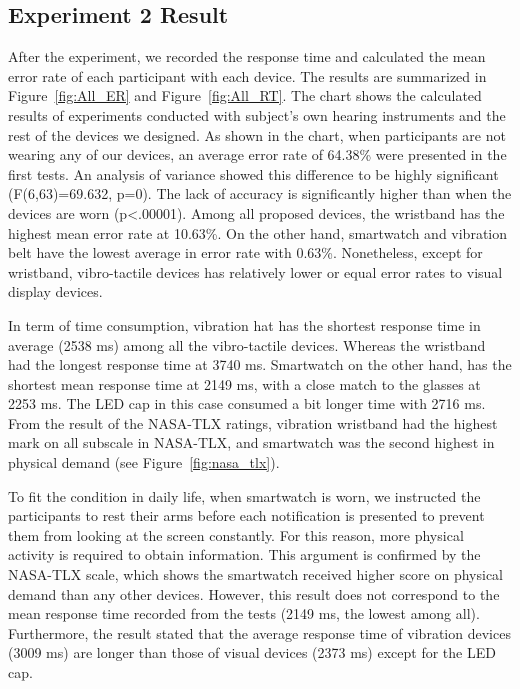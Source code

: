 \documentclass{sigchi}
\begin{document}
\subsection{Experiment 2 Result}
After the experiment, we recorded the response time and calculated the mean error rate of each participant with each device. The results are summarized in Figure~\ref{fig:All_ER} and Figure~\ref{fig:All_RT}. The chart shows the calculated results of experiments conducted with subject's own hearing instruments and the rest of the devices we designed. As shown in the chart, when participants are not wearing any of our devices, an average error rate of 64.38\% were presented in the first tests. An analysis of variance showed this difference to be highly significant (F(6,63)=69.632, p=0). The lack of accuracy is significantly higher than when the devices are worn (p\textless.00001). Among all proposed devices, the wristband has the highest mean error rate at 10.63\%. On the other hand, smartwatch and vibration belt have the lowest average in error rate with 0.63\%. Nonetheless, except for wristband, vibro-tactile devices has relatively lower or equal error rates to visual display devices.

In term of time consumption, vibration hat has the shortest response time in average (2538 ms) among all the vibro-tactile devices. Whereas the wristband had the longest response time at 3740 ms. Smartwatch on the other hand, has the shortest mean response time at 2149 ms, with a close match to the glasses at 2253 ms. The LED cap in this case consumed a bit longer time with 2716 ms. From the result of the NASA-TLX ratings, vibration wristband had the highest mark on all subscale in NASA-TLX, and smartwatch was the second highest in physical demand (see Figure~\ref{fig:nasa_tlx}). 

To fit the condition in daily life, when smartwatch is worn, we instructed the participants to rest their arms before each notification is presented to prevent them from looking at the screen constantly. For this reason, more physical activity is required to obtain information. This argument is confirmed by the NASA-TLX scale, which shows the smartwatch received higher score on physical demand than any other devices. However, this result does not correspond to the mean response time recorded from the tests (2149 ms, the lowest among all). Furthermore, the result stated that the average response time of vibration devices (3009 ms) are longer than those of visual devices (2373 ms) except for the LED cap.
\end{document}
